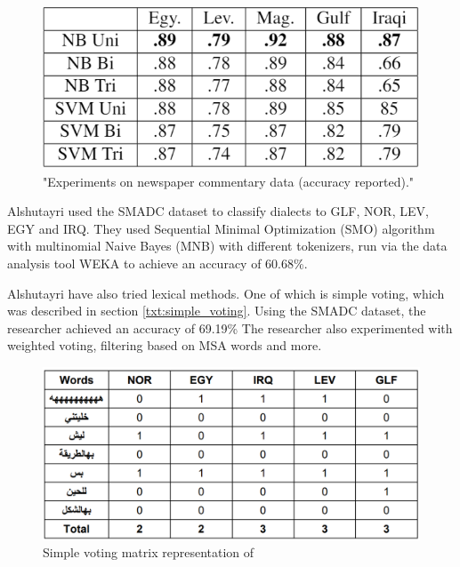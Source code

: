 \documentclass[12pt]{diazessay}
\begin{document}
    \begin{figure}[h]
        \includegraphics[scale=0.6]{Figures/results_extended_AOC.png}
        \caption{"Experiments on newspaper commentary data (accuracy reported)."\cite{cotterell-callison-burch-2014-multi}}
        \label{fig:extended_aoc_results}
    \end{figure}
    
    Alshutayri used the SMADC dataset to classify dialects to GLF, NOR, LEV, EGY and IRQ. They used Sequential Minimal Optimization (SMO) algorithm with multinomial Naive Bayes (MNB) with different tokenizers, run via the data analysis tool WEKA to achieve an accuracy of 60.68\%\cite{alshutayri}.
    
    Alshutayri have also tried lexical methods. One of which is simple voting, which was described in section \ref{txt:simple_voting}. Using the SMADC dataset, the researcher achieved an accuracy of 69.19\% The researcher also experimented with weighted voting, filtering based on MSA words and more\cite{alshutayri}.
    
    \begin{figure}[h]
        \includegraphics[scale=0.35]{Figures/smadc_simple_voting.png}
        \caption{Simple voting matrix representation of \cite{alshutayri}}
    \end{figure}
        
\end{document}
